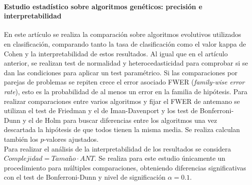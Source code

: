 	\paragraph{Estudio estadístico sobre algoritmos genéticos: precisión e interpretabilidad} \cite{GARCIA08} En este artículo se realiza la comparación sobre algoritmos evolutivos utilizados en clasificación, comparando tanto la tasa de clasificación como el valor kappa de Cohen y la interpretabilidad de estos resultados. Al igual que en el artículo anterior, se realizan test de normalidad y heterocedasticidad para comprobar si se dan las condiciones para aplicar un test paramétrico. Si las comparaciones por parejas de problemas se repiten crece el error asociado FWER (\textit{family-wise error rate}), esto es la probabilidad de al menos un error en la familia de hipótesis. Para realizar comparaciones entre varios algoritmos y fijar el FWER de antemano se utilizan el test de Friedman y el de Iman-Davenport y los test de Bonferroni-Dunn y el de Holm para buscar diferencias entre los algoritmos una vez descartada la hipótesis de que todos tienen la misma media. Se realiza calculan también los $p$-valores ajustados.\\
	Para realizar el análisis de la interpretabilidad de los resultados se considera $\textit{Complejidad} = \textit{Tamaño} \cdot ANT$. Se realiza para este estudio únicamente un procedimiento para múltiples comparaciones, obteniendo diferencias significativas con el test de Bonferroni-Dunn y nivel de significación $\alpha=0.1$.
	
